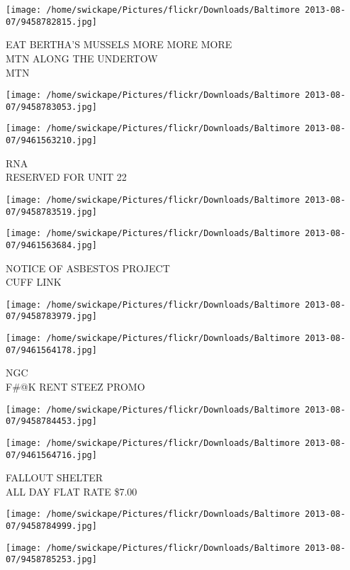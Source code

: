 \documentclass[10pt,letterpaper]{article}
\begin{document}
\texttt{[image: /home/swickape/Pictures/flickr/Downloads/Baltimore 2013-08-07/9458782815.jpg]}

EAT BERTHA'S MUSSELS MORE MORE MORE\\
MTN ALONG THE UNDERTOW\\
MTN
\pagebreak

\texttt{[image: /home/swickape/Pictures/flickr/Downloads/Baltimore 2013-08-07/9458783053.jpg]}

\vspace{0.25in}
\texttt{[image: /home/swickape/Pictures/flickr/Downloads/Baltimore 2013-08-07/9461563210.jpg]}

RNA\\
RESERVED FOR UNIT 22
\pagebreak

\texttt{[image: /home/swickape/Pictures/flickr/Downloads/Baltimore 2013-08-07/9458783519.jpg]}

\vspace{0.25in}
\texttt{[image: /home/swickape/Pictures/flickr/Downloads/Baltimore 2013-08-07/9461563684.jpg]}

NOTICE OF ASBESTOS PROJECT\\
CUFF LINK
\pagebreak

\texttt{[image: /home/swickape/Pictures/flickr/Downloads/Baltimore 2013-08-07/9458783979.jpg]}

\vspace{0.25in}
\texttt{[image: /home/swickape/Pictures/flickr/Downloads/Baltimore 2013-08-07/9461564178.jpg]}

NGC\\
F\#@K RENT STEEZ PROMO
\pagebreak

\texttt{[image: /home/swickape/Pictures/flickr/Downloads/Baltimore 2013-08-07/9458784453.jpg]}

\vspace{0.25in}
\texttt{[image: /home/swickape/Pictures/flickr/Downloads/Baltimore 2013-08-07/9461564716.jpg]}

FALLOUT SHELTER\\
ALL DAY FLAT RATE \$7.00
\pagebreak

\texttt{[image: /home/swickape/Pictures/flickr/Downloads/Baltimore 2013-08-07/9458784999.jpg]}

\vspace{0.25in}
\texttt{[image: /home/swickape/Pictures/flickr/Downloads/Baltimore 2013-08-07/9458785253.jpg]}
\end{document}
